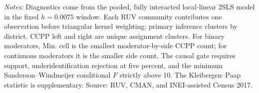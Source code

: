 \begin{table}[!htbp]
\centering
\caption{Local support and fuzzy-heterogeneity identification diagnostics}
\label{tab:hte-2017_ccpp-diagnostics}
\small
{}
\parbox{0.97\linewidth}{\footnotesize \textit{Notes:} Diagnostics come from the pooled, fully interacted local-linear 2SLS model in the fixed \(h=0.0075\) window. Each RUV community contributes one observation before triangular kernel weighting; primary inference clusters by district. CCPP left and right are unique assignment clusters. For binary moderators, Min. cell is the smallest moderator-by-side CCPP count; for continuous moderators it is the smaller side count. The causal gate requires support, underidentification rejection at five percent, and the minimum Sanderson--Windmeijer conditional \(F\) strictly above 10. The Kleibergen--Paap statistic is supplementary. Source: RUV, CMAN, and INEI-assisted Census 2017.}
\end{table}

